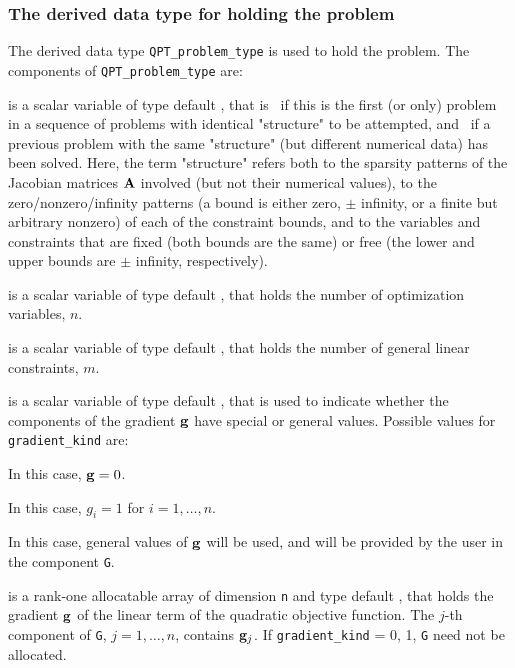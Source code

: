 \documentclass{galahad}
\begin{document}

\subsubsection{The derived data type for holding the problem}\label{typeprob}
The derived data type {\tt QPT\_problem\_type} is used to hold 
the problem. The components of 
{\tt QPT\_problem\_type} 
are:

\begin{description}

 is a scalar variable of type default \logical, 
 that is \true\ if this is the first (or only) problem in a sequence of 
 problems with identical "structure" to be attempted, and \false\ if 
 a previous problem with the same "structure" (but different
 numerical data) has been solved. Here, the term "structure" refers both to 
 the sparsity patterns of the Jacobian matrices ${\mathbf{A}}$ involved 
 (but not their numerical values), to the zero/nonzero/infinity patterns 
 (a bound is either zero, $\pm$ infinity, or a finite but arbitrary 
 nonzero) of each of the constraint bounds, and to the variables and constraints
 that are fixed (both bounds are the same) or free (the lower and upper
 bounds are $\pm$ infinity, respectively).

 is a scalar variable of type default \integer, 
 that holds the number of optimization variables, $n$.  
              
 is a scalar variable of type default \integer, 
 that holds the number of general linear constraints, $m$.
              
 is a scalar variable of type default \integer, 
that is used to indicate whether the components of the gradient ${\mathbf{g}}$ 
have special or general values. Possible values for {\tt gradient\_kind} are:
\begin{description}
  In this case, ${\mathbf{g}} = 0$.

 In this case, $g_{i} = 1$ for $i = 1, \ldots ,n$.

 In this case, general values of ${\mathbf{g}}$ will be used,
     and will be provided by the user in the component {\tt G}.
\end{description}

 is a rank-one allocatable array of dimension {\tt n} and type 
default \realdp, that holds the gradient ${\mathbf{g}}$ 
of the linear term of the quadratic objective function.
The $j$-th component of 
{\tt G}, $j = 1,  \ldots ,  n$, contains ${\mathbf{g}}_{j}$.
If {\tt gradient\_kind} {= 0, 1}, {\tt G} need not be allocated.


\end{description}
\end{document}
